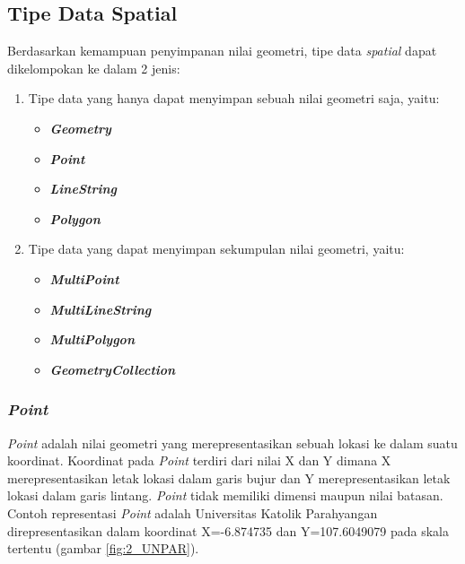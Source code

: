 \subsection{Tipe Data Spatial}
\label{sec:tipe_data_spatial}
Berdasarkan kemampuan penyimpanan nilai geometri\cite{spatialtipedata}, tipe data \textit{spatial} dapat dikelompokan ke dalam 2 jenis:
\begin{enumerate}
	\item Tipe data yang hanya dapat menyimpan sebuah nilai geometri saja, yaitu:
	\begin{itemize}
		\item \textbf{\textit{Geometry}}
		\item \textbf{\textit{Point}}
		\item \textbf{\textit{LineString}}
		\item \textbf{\textit{Polygon}}
	\end{itemize}
	\item Tipe data yang dapat menyimpan sekumpulan nilai geometri, yaitu:
	\begin{itemize}
		\item \textbf{\textit{MultiPoint}}
		\item \textbf{\textit{MultiLineString}}
		\item \textbf{\textit{MultiPolygon}}
		\item \textbf{\textit{GeometryCollection}}
	\end{itemize}
\end{enumerate}

\subsubsection{\textit{Point}}
\label{sec:point}
\textit{Point} adalah nilai geometri yang merepresentasikan sebuah lokasi ke dalam suatu koordinat\cite{spatialtipedatapoint}. Koordinat pada \textit{Point} terdiri dari nilai X dan Y dimana X merepresentasikan letak lokasi dalam garis bujur dan Y merepresentasikan letak lokasi dalam garis lintang. \textit{Point} tidak memiliki dimensi maupun nilai batasan. Contoh representasi \textit{Point} adalah Universitas Katolik Parahyangan direpresentasikan dalam koordinat X=-6.874735 dan Y=107.6049079 pada skala tertentu (gambar \ref{fig:2_UNPAR}).

